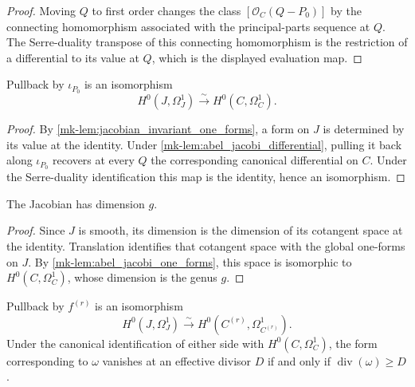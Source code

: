 \begin{proof}
  Moving \(Q\) to first order changes the class
  \([\mathcal O_C(Q-P_0)]\) by the connecting homomorphism associated with
  the principal-parts sequence at \(Q\).  The Serre-duality transpose of
  this connecting homomorphism is the restriction of a differential to its
  value at \(Q\), which is the displayed evaluation map.
\end{proof}

\begin{lemma}
  \label{mk-lem:abel_jacobi_one_forms}

  Pullback by \(\iota_{P_0}\) is an isomorphism
  \[
    H^0(J,\Omega_J^1)\xrightarrow{\sim}H^0(C,\Omega_C^1).
  \]
\end{lemma}

\begin{proof}
  By \ref{mk-lem:jacobian_invariant_one_forms}, a form on \(J\) is determined
  by its value at the identity.  Under
  \ref{mk-lem:abel_jacobi_differential}, pulling it back along
  \(\iota_{P_0}\) recovers at every \(Q\) the corresponding canonical
  differential on \(C\).  Under the Serre-duality identification this map
  is the identity, hence an isomorphism.
\end{proof}

\begin{lemma}
  \label{mk-lem:jacobian_dimension}

  The Jacobian has dimension \(g\).
\end{lemma}

\begin{proof}
  Since \(J\) is smooth, its dimension is the dimension of its cotangent
  space at the identity.  Translation identifies that cotangent space with
  the global one-forms on \(J\).  By
  \ref{mk-lem:abel_jacobi_one_forms}, this space is isomorphic to
  \(H^0(C,\Omega_C^1)\), whose dimension is the genus \(g\).
\end{proof}

\begin{proposition}
  \label{mk-prop:symmetric_product_differentials}

  Pullback by \(f^{(r)}\) is an isomorphism
  \[
    H^0(J,\Omega_J^1)\xrightarrow{\sim}
    H^0(C^{(r)},\Omega_{C^{(r)}}^1).
  \]
  Under the canonical identification of either side with
  \(H^0(C,\Omega_C^1)\), the form corresponding to \(\omega\) vanishes at
  an effective divisor \(D\) if and only if
  \(\operatorname{div}(\omega)\ge D\).
\end{proposition}

